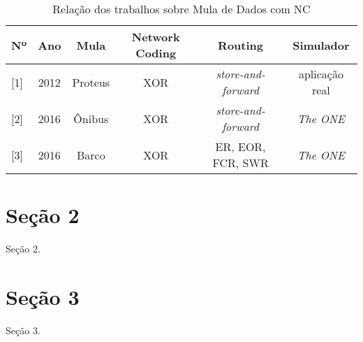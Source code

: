         \begin{table}[H]
        	\centering
        	\begin{tabular}{p{0.8cm}S[table-format=0.1]S[table-format=0.1]S[table-format=0.1]S[table-format=0.1]S[table-format=0.1]}
        		\toprule
        		{\textbf{Nº}} & {\textbf{Ano}} & {\textbf{Mula}} & {\textbf{Network Coding}} & {\textbf{Routing}} & {\textbf{Simulador}}
        		\\
        		\midrule
        		{[1]} & {2012} & {Proteus} & {XOR} & \textit{store-and-forward} & {aplicação real}   \\
        		{[2]} & {2016} & {Ônibus} & {XOR} & \textit{store-and-forward} & \textit{The ONE} \\ 
        		{[3]} & {2016} & {Barco} & {XOR} & {ER, EOR, FCR, SWR} & \textit{The ONE}   \\
        		\bottomrule
        	\end{tabular}
        	\caption{\label{table:trabalhoMulaNC}Relação dos trabalhos sobre Mula de Dados com NC}	
        \end{table}
	
	\section{Seção 2}
	
		Seção 2.

	\section{Seção 3}
	
		Seção 3.
		